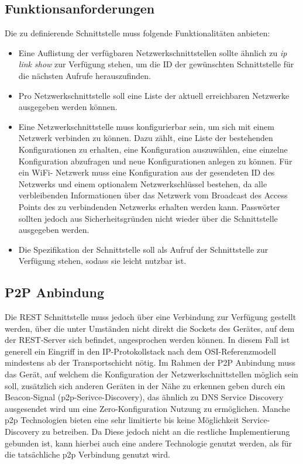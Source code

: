 	\subsection{Funktionsanforderungen}

    Die zu definierende Schnittstelle muss folgende Funktionalitäten anbieten:
    \begin{itemize}
        \item Eine Auflistung der verfügbaren Netzwerkschnittstellen sollte ähnlich zu {\it ip link show} zur Verfügung stehen, um die ID der gewünschten Schnittstelle für die nächsten Aufrufe herauszufinden.
        \item Pro Netzwerkschnittstelle soll eine Liste der aktuell erreichbaren Netzwerke ausgegeben werden können.
        \item Eine Netzwerkschnittstelle muss konfigurierbar sein, um sich mit einem Netzwerk verbinden zu können. Dazu zählt, eine Liste der bestehenden Konfigurationen zu erhalten, eine Konfiguration auszuwählen, eine einzelne Konfiguration abzufragen und neue Konfigurationen anlegen zu können. Für ein WiFi- Netzwerk muss eine Konfiguration aus der gesendeten ID des Netzwerks und einem optionalem Netzwerkschlüssel bestehen, da alle verbleibenden Informationen über das Netzwerk vom Broadcast des Access Points des zu verbindenden Netzwerks erhalten werden kann.
        Passwörter sollten jedoch aus Sicherheitsgründen nicht wieder über die Schnittstelle ausgegeben werden.
        
        \item Die Spezifikation der Schnittstelle soll als Aufruf der Schnittstelle zur Verfügung stehen, sodass sie leicht nutzbar ist.
    \end{itemize}
    
    \subsection{P2P Anbindung}

	Die REST Schnittstelle muss jedoch über eine Verbindung zur Verfügung gestellt werden, über die unter Umständen nicht direkt die Sockets des Gerätes, auf dem der REST-Server sich befindet, angesprochen werden können. In diesem Fall ist generell ein Eingriff in den IP-Protokollstack nach dem OSI-Referenzmodell mindestens ab der Transportschicht nötig. Im Rahmen der P2P Anbindung muss das Gerät, auf welchem die Konfiguration der Netzwerkschnittstellen möglich sein soll, zusätzlich sich anderen Geräten in der Nähe zu erkennen geben durch ein Beacon-Signal (p2p-Serivce-Discovery), das ähnlich zu DNS Service Discovery ausgesendet wird um eine Zero-Konfiguration Nutzung zu ermöglichen.\cite{Kaiser} Manche p2p Technologien bieten eine sehr limitierte bis keine Möglichkeit Service-Discovery zu betreiben. Da Diese jedoch nicht an die restliche Implementierung gebunden ist, kann hierbei auch eine andere Technologie genutzt werden, als für die tatsächliche p2p Verbindung genutzt wird.

